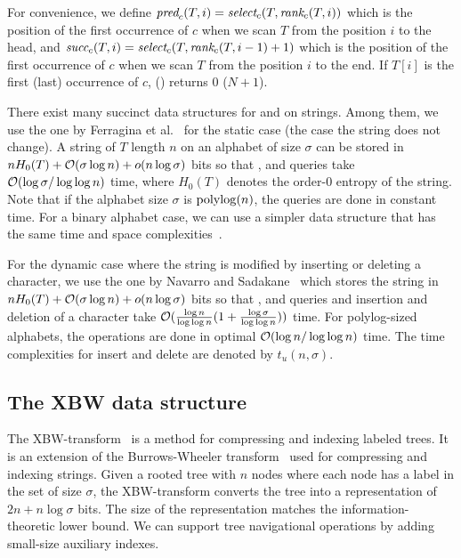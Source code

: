 For convenience, we define ${\textit{pred}}_c(T,i) = {\textit{select}}_c(T, {\textit{rank}}_c(T, i))$ which is the position of the first occurrence of $c$ when we scan $T$ from the position $i$ to the head, and ${\textit{succ}}_c(T,i) = {\textit{select}}_c(T, {\textit{rank}}_c(T, i-1)+1)$ which is the position of the first occurrence of $c$ when we scan $T$ from the position $i$ to the end. If $T[i]$ is the first (last) occurrence of $c$, {\pred} (\succ) returns $0$ ($N+1$).


There exist many succinct data structures for {\rank} and {\select} on strings.
Among them, we use the one by Ferragina et al.~\cite{FerManMakNav06} for the static case
(the case the string does not change).  A string of $T$ length $n$ on an alphabet of size $\sigma$
can be stored in $nH_0(T) + \mathcal{O}(\sigma \log n) + o(n \log\sigma)$ bits so that
{\rank}, {\select} and {\access} queries take $\mathcal{O}(\log\sigma / \log\log n)$ time,
where $H_0(T)$ denotes the order-$0$ entropy of the string.  Note that if the alphabet size $\sigma$
is ${\mathop{\mathrm{polylog}}\nolimits}(n)$, the queries are done in constant time.  For a binary alphabet case,
we can use a simpler data structure that has the same time and space complexities~\cite{RRR07}.

For the dynamic case where the string is modified by inserting or deleting a character,
we use the one by Navarro and Sadakane~\cite{NavSad10} which stores the string
in $nH_0(T) + \mathcal{O}(\sigma \log n) + o(n \log\sigma)$ bits so that
{\rank}, {\select} and {\access} queries and insertion and deletion of a character take
$\mathcal{O}(\frac{\log n}{\log \log n}(1+\frac{\log\sigma}{\log\log n}))$ time.
For polylog-sized alphabets, the operations are done in optimal $\mathcal{O}(\log n/\log \log n)$ time.
The time complexities for insert and delete are denoted by $t_u(n,\sigma)$.


\subsection{The XBW data structure}
The XBW-transform~\cite{FLMM09} is a method for compressing and indexing labeled trees.
It is an extension of the Burrows-Wheeler transform~\cite{BW94} used for compressing
and indexing strings.  Given a rooted tree with $n$ nodes where each node has a label in
the set of size $\sigma$, the XBW-transform converts the tree into a representation of
$2n + n \log\sigma$ bits.  The size of the representation matches the information-theoretic
lower bound.  We can support tree navigational operations by adding small-size auxiliary
indexes.

